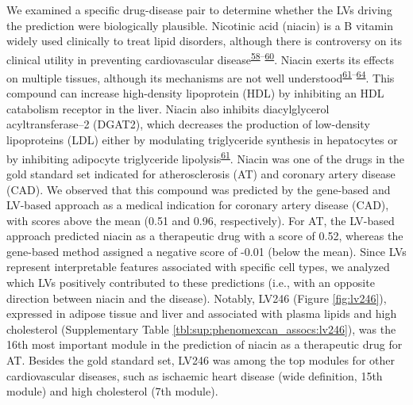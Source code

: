 \documentclass[
  a4paper,
]{article}
\begin{document}
We examined a specific drug-disease pair to determine whether the LVs driving the prediction were biologically plausible.
Nicotinic acid (niacin) is a B vitamin widely used clinically to treat lipid disorders, although there is controversy on its clinical utility in preventing cardiovascular disease\textsuperscript{\protect\hyperlink{ref-bRPc66OD}{58}--\protect\hyperlink{ref-ZGvG75Bj}{60}}.
Niacin exerts its effects on multiple tissues, although its mechanisms are not well understood\textsuperscript{\protect\hyperlink{ref-LVihFr3g}{61}--\protect\hyperlink{ref-13meq3Hgt}{64}}.
This compound can increase high-density lipoprotein (HDL) by inhibiting an HDL catabolism receptor in the liver.
Niacin also inhibits diacylglycerol acyltransferase--2 (DGAT2), which decreases the production of low-density lipoproteins (LDL) either by modulating triglyceride synthesis in hepatocytes or by inhibiting adipocyte triglyceride lipolysis\textsuperscript{\protect\hyperlink{ref-LVihFr3g}{61}}.
Niacin was one of the drugs in the gold standard set indicated for atherosclerosis (AT) and coronary artery disease (CAD).
We observed that this compound was predicted by the gene-based and LV-based approach as a medical indication for coronary artery disease (CAD), with scores above the mean (0.51 and 0.96, respectively).
For AT, the LV-based approach predicted niacin as a therapeutic drug with a score of 0.52, whereas the gene-based method assigned a negative score of -0.01 (below the mean).
Since LVs represent interpretable features associated with specific cell types, we analyzed which LVs positively contributed to these predictions (i.e., with an opposite direction between niacin and the disease).
Notably, LV246 (Figure \ref{fig:lv246}), expressed in adipose tissue and liver and associated with plasma lipids and high cholesterol (Supplementary Table \ref{tbl:sup:phenomexcan_assocs:lv246}), was the 16th most important module in the prediction of niacin as a therapeutic drug for AT.
Besides the gold standard set, LV246 was among the top modules for other cardiovascular diseases, such as ischaemic heart disease (wide definition, 15th module) and high cholesterol (7th module).
\end{document}

